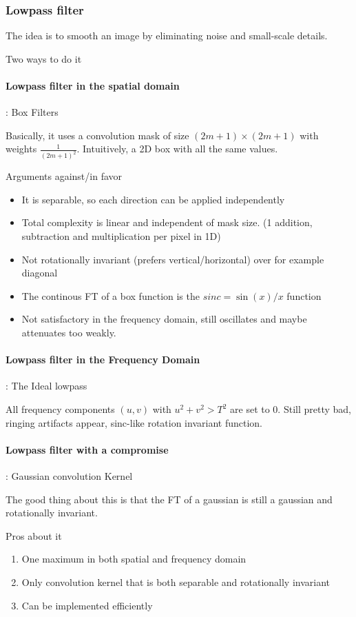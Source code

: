 \documentclass{article}
\begin{document}
\subsubsection{Lowpass filter}
The idea is to smooth an image by eliminating noise and small-scale details.

Two ways to do it
\paragraph{Lowpass filter in the spatial domain}: Box Filters

Basically, it uses a convolution mask of size $(2m+1) \times (2m+1)$ with weights $\frac{1}{(2m+1)^2}$. Intuitively, a 2D box with all the same values.

Arguments against/in favor
\begin{itemize}
  \item It is separable, so each direction can be applied independently
  \item Total complexity is linear and independent of mask size. (1 addition, subtraction and multiplication per pixel in 1D)
  \item Not rotationally invariant (prefers vertical/horizontal) over for example diagonal
  \item The continous FT of a box function is the $sinc = \sin(x)/x$ function
  \item Not satisfactory in the frequency domain, still oscillates and maybe attenuates too weakly.
\end{itemize}

\paragraph{Lowpass filter in the Frequency Domain}: The Ideal lowpass

All frequency components $(u,v)$ with $u^2+v^2 > T^2$ are set to 0. Still pretty bad, ringing artifacts appear, sinc-like rotation invariant function.

\paragraph{Lowpass filter with a compromise}: Gaussian convolution Kernel

The good thing about this is that the FT of a gaussian is still a gaussian and rotationally invariant. 

Pros about it
\begin{enumerate}
  \item One maximum in both spatial and frequency domain
  \item Only convolution kernel that is both separable and rotationally invariant
  \item Can be implemented efficiently
\end{enumerate}
\end{document}
